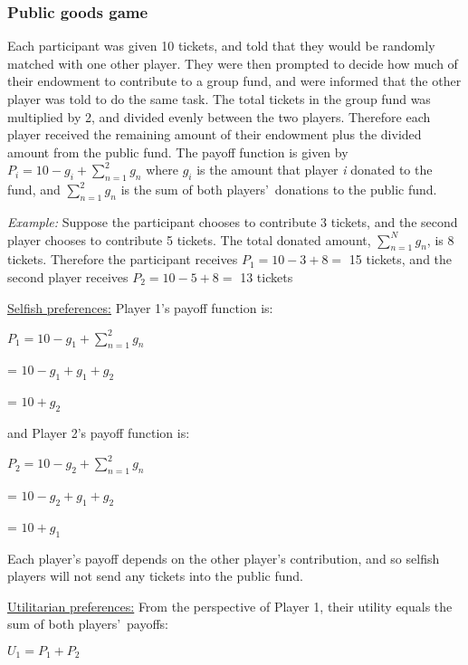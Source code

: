 \documentclass[12pt]{article}
\begin{document}
\subsubsection{Public goods game}

Each participant was given 10 tickets, and told that they would be randomly matched with one other player. They were then prompted to decide how much of their endowment to contribute to a group fund, and were informed that the other player was told to do the same task. The total tickets in the group fund was multiplied by 2, and divided evenly between the two players. Therefore each player received the remaining amount of their endowment plus the divided amount from the public fund. The payoff function is given by \( P_{i} = 10 - g_{i} + \sum_{n=1}^{2} g_{n}\) where \(g_{i}\) is the amount that player \textit{i} donated to the fund, and \(\sum_{n=1}^{2}g_{n}\) is the sum of both players\rq \ donations to the public fund.

\textit{Example:} Suppose the participant chooses to contribute 3 tickets, and the second player chooses to contribute 5 tickets. The total donated amount, \(\sum_{n=1}^{N} g_{n}\), is 8 tickets. Therefore the participant receives \( P_{1} = 10 - 3 + 8  = \) 15 tickets, and the second player receives \( P_{2} = 10 - 5 + 8 = \) 13 tickets 

\underline{Selfish preferences:} Player 1\rq s payoff function is:

\( P_{1} = 10 - g_{1} + \sum_{n=1}^{2} g_{n} \)

\hspace{4mm} = \(10 - g_{1} + g_{1} + g_{2} \)

\hspace{4mm} = \(10 + g_{2}\)

\noindent and Player 2\rq s payoff function is:

\( P_{2} = 10 - g_{2} + \sum_{n=1}^{2} g_{n} \)

\hspace{4mm} = \(10 - g_{2} + g_{1} + g_{2} \)

\hspace{4mm} = \(10 + g_{1}\)

Each player\rq s payoff depends on the other player\rq s contribution, and so selfish players will not send any tickets into the public fund.

\underline{Utilitarian preferences:} From the perspective of Player 1, their utility equals the sum of both players\rq \ payoffs:

\(U_{1} = P_{1} + P_{2}\)
\end{document}
